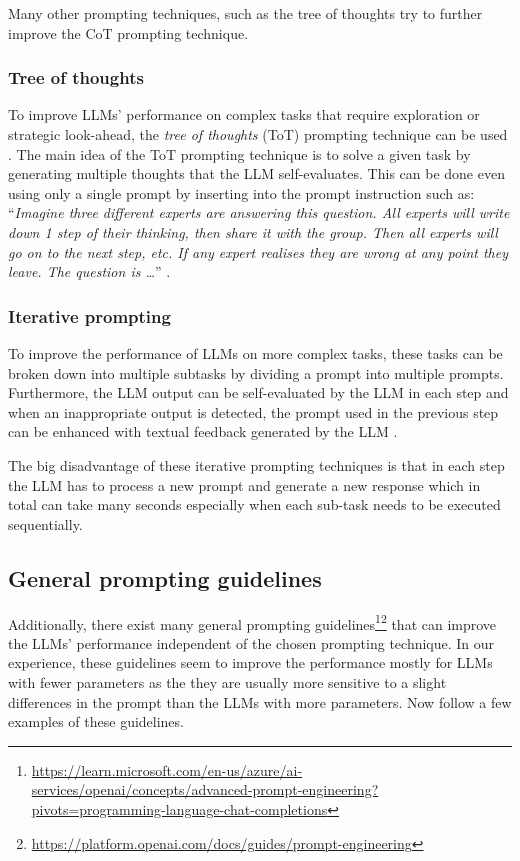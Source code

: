 Many other prompting techniques, such as the tree of thoughts try to further improve the CoT prompting technique.


\subsubsection{Tree of thoughts}
\label{sec:tree_of_thoughts}

To improve LLMs' performance on complex tasks that require exploration or strategic look-ahead, the \emph{tree of thoughts} (ToT) prompting technique can be used \cite{Long2023, Yao2024}. The main idea of the ToT prompting technique is to solve a given task by generating multiple thoughts that the LLM self-evaluates. This can be done even using only a single prompt by inserting into the prompt instruction such as: ``\textit{Imagine three different experts are answering this question. All experts will write down 1 step of their thinking, then share it with the group. Then all experts will go on to the next step, etc. If any expert realises they are wrong at any point they leave. The question is \ldots}'' \cite{Hulbert2023}.


\subsubsection{Iterative prompting}
\label{sec:iterative_prompting}

To improve the performance of LLMs on more complex tasks, these tasks can be broken down into multiple subtasks by dividing a prompt into multiple prompts. Furthermore, the LLM output can be self-evaluated by the LLM in each step and when an inappropriate output is detected, the prompt used in the previous step can be enhanced with textual feedback generated by the LLM \cite{Shinn2024}.

The big disadvantage of these iterative prompting techniques is that in each step the LLM has to process a new prompt and generate a new response which in total can take many seconds especially when each sub-task needs to be executed sequentially.


\subsection{General prompting guidelines}
\label{prompt_general_tips}

Additionally, there exist many general prompting guidelines\footnote{\url{https://learn.microsoft.com/en-us/azure/ai-services/openai/concepts/advanced-prompt-engineering?pivots=programming-language-chat-completions}}\footnote{\url{https://platform.openai.com/docs/guides/prompt-engineering}} that can improve the LLMs' performance independent of the chosen prompting technique. In our experience, these guidelines seem to improve the performance mostly for LLMs with fewer parameters as the they are usually more sensitive to a slight differences in the prompt than the LLMs with more parameters. Now follow a few examples of these guidelines.



